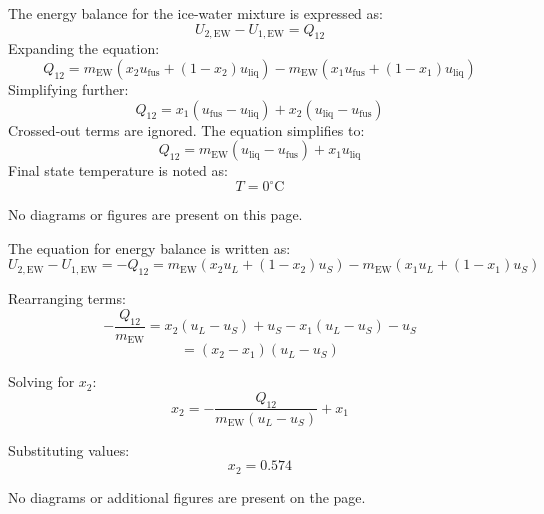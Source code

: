 The energy balance for the ice-water mixture is expressed as:  
\[
U_{2,\text{EW}} - U_{1,\text{EW}} = Q_{12}
\]  
Expanding the equation:  
\[
Q_{12} = m_{\text{EW}} \left( x_2 u_{\text{fus}} + (1 - x_2) u_{\text{liq}} \right) - m_{\text{EW}} \left( x_1 u_{\text{fus}} + (1 - x_1) u_{\text{liq}} \right)
\]  
Simplifying further:  
\[
Q_{12} = x_1 \left( u_{\text{fus}} - u_{\text{liq}} \right) + x_2 \left( u_{\text{liq}} - u_{\text{fus}} \right)
\]  
Crossed-out terms are ignored. The equation simplifies to:  
\[
Q_{12} = m_{\text{EW}} \left( u_{\text{liq}} - u_{\text{fus}} \right) + x_1 u_{\text{liq}}
\]  
Final state temperature is noted as:  
\[
T = 0^\circ\text{C}
\]  

No diagrams or figures are present on this page.

The equation for energy balance is written as:  
\[
U_{2,\text{EW}} - U_{1,\text{EW}} = -Q_{12} = m_{\text{EW}} \left( x_2 u_L + (1 - x_2) u_S \right) - m_{\text{EW}} \left( x_1 u_L + (1 - x_1) u_S \right)
\]  

Rearranging terms:  
\[
-\frac{Q_{12}}{m_{\text{EW}}} = x_2 (u_L - u_S) + u_S - x_1 (u_L - u_S) - u_S
\]  
\[
= (x_2 - x_1)(u_L - u_S)
\]  

Solving for \( x_2 \):  
\[
x_2 = -\frac{Q_{12}}{m_{\text{EW}} (u_L - u_S)} + x_1
\]  

Substituting values:  
\[
x_2 = 0.574
\]  

No diagrams or additional figures are present on the page.